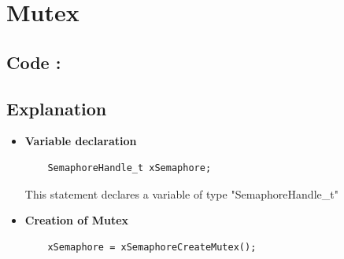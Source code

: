 \documentclass[11pt,a4paper]{article}
\begin{document}
\section{Mutex}

\subsection{Code : }
	
\newpage

\subsection{Explanation}
\begin{itemize}
	\item \textbf{Variable declaration}	
	
	\begin{lstlisting}
	SemaphoreHandle_t xSemaphore;
	\end{lstlisting}
	
	This statement declares a variable of type "SemaphoreHandle\_t"
	
	\item \textbf{Creation of Mutex}
	
	\begin{lstlisting}
	xSemaphore = xSemaphoreCreateMutex();
	\end{lstlisting}
	

\end{itemize}
\end{document}
